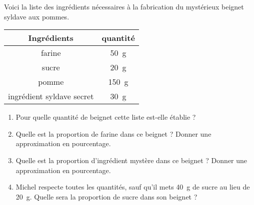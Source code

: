 
\begin{exercice}\label{exo2smath-0323}

    \begin{multicols}{2}
    Voici la liste des ingrédients nécessaires à la fabrication du mystérieux beignet syldave aux pommes.
    \begin{center}
    \begin{tabular}[]{|c||c|}
        \hline
        Ingrédients&quantité\\
        \hline\hline
        farine&\SI{50}{\gram}\\
        \hline
        sucre&\SI{20}{\gram}\\
        \hline
        pomme&\SI{150}{\gram}\\
        \hline
        ingrédient syldave secret&\SI{30}{\gram}\\
        \hline
    \end{tabular}
    \end{center}
    \columnbreak
    \begin{enumerate}
        \item
            Pour quelle quantité de beignet cette liste est-elle établie ?
        \item
            Quelle est la proportion de farine dans ce beignet ? Donner une approximation en pourcentage.
        \item
            Quelle est la proportion d'ingrédient mystère dans ce beignet ? Donner une approximation en pourcentage.
        \item
            Michel respecte toutes les quantités, sauf qu'il mets \SI{40}{\gram} de sucre au lieu de \SI{20}{\gram}. Quelle sera la proportion de sucre dans son beignet ?
    \end{enumerate}
    \end{multicols}

\end{exercice}
